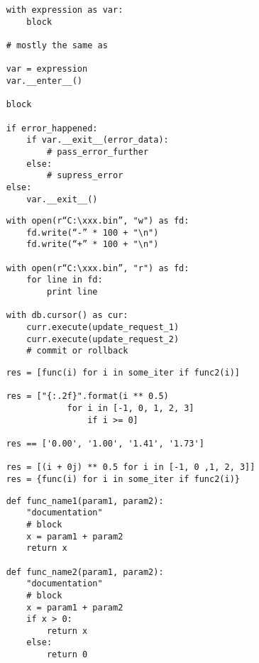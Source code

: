 \documentclass{article}
\begin{document}
\vspace{15pt}
\begin{lstlisting}
	with expression as var:
		block

	# mostly the same as
	
	var = expression
	var.__enter__()
	
	block
	
	if error_happened:
		if var.__exit__(error_data):
			# pass_error_further
		else:
			# supress_error
	else:
		var.__exit__()
\end{lstlisting}
\newpage

\vspace{15pt}
\begin{lstlisting}
	with open(r“C:\xxx.bin”, "w") as fd:
	    fd.write(“-” * 100 + "\n")
	    fd.write(“+” * 100 + "\n")

	with open(r“C:\xxx.bin”, "r") as fd:
	    for line in fd:
	    	print line

	with db.cursor() as cur:
	    curr.execute(update_request_1)
	    curr.execute(update_request_2)
		# commit or rollback
\end{lstlisting}
\newpage

\vspace{15pt}
\begin{lstlisting}
	res = [func(i) for i in some_iter if func2(i)]

	res = ["{:.2f}".format(i ** 0.5) 
				for i in [-1, 0, 1, 2, 3] 
					if i >= 0]
	
	res == ['0.00', '1.00', '1.41', '1.73']

	res = [(i + 0j) ** 0.5 for i in [-1, 0 ,1, 2, 3]]
	res = {func(i) for i in some_iter if func2(i)}
\end{lstlisting}
\newpage

\begin{lstlisting}
	def func_name1(param1, param2):
		"documentation"
		# block
		x = param1 + param2
		return x

	def func_name2(param1, param2):
		"documentation"
		# block
		x = param1 + param2
		if x > 0:
			return x
		else:
			return 0
\end{lstlisting}
\newpage
\end{document}
